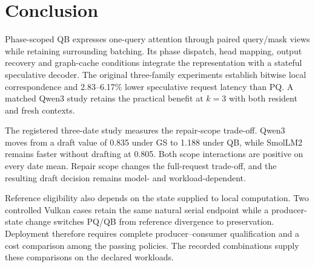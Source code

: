\section{Conclusion}
Phase-scoped QB expresses one-query attention through paired query/mask views while retaining surrounding batching. Its phase dispatch, head mapping, output recovery and graph-cache conditions integrate the representation with a stateful speculative decoder. The original three-family experiments establish bitwise local correspondence and 2.83--6.17\% lower speculative request latency than PQ. A matched Qwen3 study retains the practical benefit at $k=3$ with both resident and fresh contexts.

The registered three-date study measures the repair-scope trade-off. Qwen3 moves from a draft value of 0.835 under GS to 1.188 under QB, while SmolLM2 remains faster without drafting at 0.805. Both scope interactions are positive on every date mean. Repair scope changes the full-request trade-off, and the resulting draft decision remains model- and workload-dependent.

Reference eligibility also depends on the state supplied to local computation. Two controlled Vulkan cases retain the same natural serial endpoint while a producer-state change switches PQ/QB from reference divergence to preservation. Deployment therefore requires complete producer--consumer qualification and a cost comparison among the passing policies. The recorded combinations supply these comparisons on the declared workloads.
